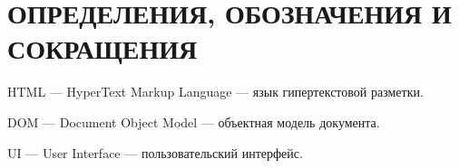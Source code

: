 \section*{ОПРЕДЕЛЕНИЯ, ОБОЗНАЧЕНИЯ И СОКРАЩЕНИЯ}

HTML --- HyperText Markup Language --- язык гипертекстовой разметки.

DOM --- Document Object Model --- объектная модель документа.

UI --- User Interface --- пользовательский интерфейс.



\pagebreak